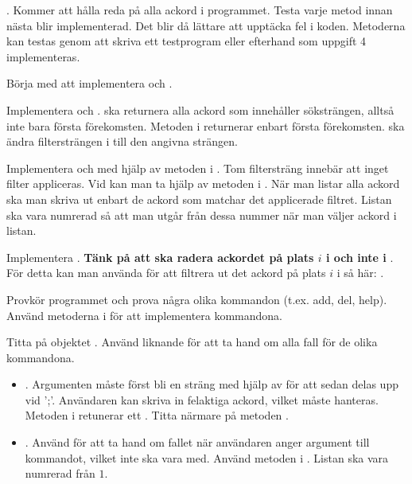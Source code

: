 {\Task {}. Kommer att hålla reda på alla ackord i programmet. Testa varje metod innan nästa blir implementerad. Det blir då lättare att upptäcka fel i koden. Metoderna kan testas genom att skriva ett testprogram eller efterhand som uppgift 4 implementeras.

\Subtask Börja med att implementera  och .

\Subtask Implementera  och .  ska returnera alla ackord som innehåller söksträngen, alltså inte bara första förekomsten. Metoden  i  returnerar enbart första förekomsten.  ska ändra filtersträngen i  till den angivna strängen.

\Subtask Implementera  och  med hjälp av metoden  i . Tom filtersträng innebär att inget filter appliceras. Vid  kan man ta hjälp av metoden  i . När man listar alla ackord ska man skriva ut enbart de ackord som matchar det applicerade filtret. Listan ska vara numrerad så att man utgår från dessa nummer när man väljer ackord i listan.

\Subtask Implementera . \textbf{Tänk på att  ska radera ackordet på plats $i$ i  och inte i }. För detta kan man använda  för att filtrera ut det ackord på plats $i$ i  så här: .

\Task {}

\Subtask Provkör programmet och prova några olika kommandon (t.ex. add, del, help). Använd metoderna i  för att implementera kommandona.

\Subtask Titta på objektet . Använd liknande  för att ta hand om alla fall för de olika kommandona.

\begin{itemize}
\item {}. Argumenten måste först bli en sträng med hjälp av  för att sedan delas upp vid ';'. Användaren kan skriva in felaktiga ackord, vilket måste hanteras. Metoden  i  retunerar ett . Titta närmare på metoden .

\item {}. Använd  för att ta hand om fallet när användaren anger argument till kommandot, vilket inte ska vara med. Använd metoden i . Listan ska vara numrerad från $1$.


\end{itemize}}

